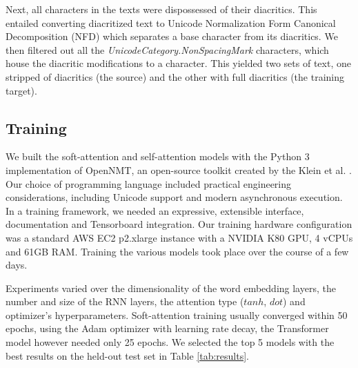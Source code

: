 \documentclass[a4paper]{article}
\begin{document}
Next, all characters in the texts were dispossessed of their diacritics. This entailed converting diacritized text to Unicode Normalization Form Canonical Decomposition (NFD) which separates a base character from its diacritics. We then filtered out all the \emph{UnicodeCategory.NonSpacingMark} characters, which house the diacritic modifications to a character. This yielded two sets of text, one stripped of diacritics (the source) and the other with full diacritics (the training target).

\subsection{Training}
We built the soft-attention and self-attention models with the Python 3 implementation of OpenNMT, an open-source toolkit created by the Klein et al. \cite{opennmt}. Our choice of programming language included practical engineering considerations, including Unicode support and modern asynchronous execution. In a training framework, we needed an expressive, extensible interface, documentation and Tensorboard integration. Our training hardware configuration was a standard AWS EC2 p2.xlarge instance with a NVIDIA K80 GPU, 4 vCPUs and 61GB RAM. Training the various models took place over the course of a few days.

Experiments varied over the dimensionality of the word embedding layers, the number and size of the RNN layers, the attention type ($tanh$, $dot$) and optimizer's hyperparameters. Soft-attention training usually converged within 50 epochs, using the Adam optimizer with learning rate decay, the Transformer model however needed only 25 epochs. We selected the top 5 models with the best results on the held-out test set in Table \ref{tab:results}. 
\end{document}
